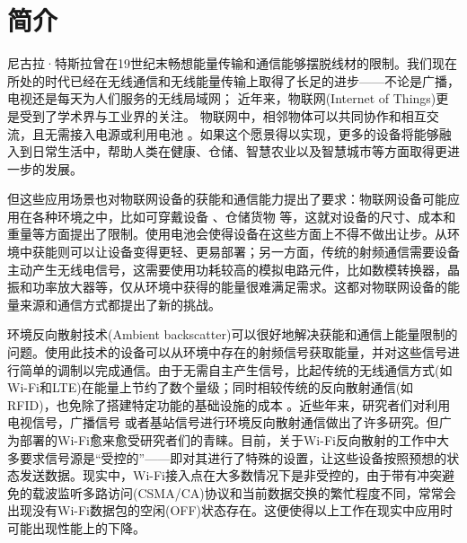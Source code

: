 
\chapter{简介}
\label{chap:introduction}

尼古拉·特斯拉曾在19世纪末畅想能量传输和通信能够摆脱线材的限制。我们现在所处的时代已经在无线通信和无线能量传输上取得了长足的进步——不论是广播，电视还是每天为人们服务的无线局域网；
近年来，物联网(Internet of Things)更是受到了学术界与工业界的关注。
物联网中，相邻物体可以共同协作和相互交流，且无需接入电源或利用电池\cite{gershenfeld2004internet}
。如果这个愿景得以实现，更多的设备将能够融入到日常生活中，帮助人类在健康、仓储、智慧农业以及智慧城市等方面取得更进一步的发展。

但这些应用场景也对物联网设备的获能和通信能力提出了要求：物联网设备可能应用在各种环境之中，比如可穿戴设备\cite{baker2017internet}
、仓储货物\cite{lee2018design}
等，这就对设备的尺寸、成本和重量等方面提出了限制。使用电池会使得设备在这些方面上不得不做出让步。从环境中获能则可以让设备变得更轻、更易部署；另一方面，传统的射频通信需要设备主动产生无线电信号，这需要使用功耗较高的模拟电路元件，比如数模转换器，晶振和功率放大器等，仅从环境中获得的能量很难满足需求。这都对物联网设备的能量来源和通信方式都提出了新的挑战。

环境反向散射技术(Ambient backscatter)可以很好地解决获能和通信上能量限制的问题。使用此技术的设备可以从环境中存在的射频信号获取能量，并对这些信号进行简单的调制以完成通信。由于无需自主产生信号，比起传统的无线通信方式(如Wi-Fi和LTE)在能量上节约了数个量级；同时相较传统的反向散射通信(如RFID)，也免除了搭建特定功能的基础设施的成本\cite{liu2013ambient}
。近些年来，研究者们对利用电视信号\cite{liu2013ambient}，广播信号\cite{wang2017fm}
或者基站信号\cite{parks2014sifting}进行环境反向散射通信做出了许多研究。但广为部署的Wi-Fi愈来愈受研究者们的青睐。目前，关于Wi-Fi反向散射的工作中大多要求信号源是“受控的”——即对其进行了特殊的设置，让这些设备按照预想的状态发送数据。现实中，Wi-Fi接入点在大多数情况下是非受控的，由于带有冲突避免的载波监听多路访问(CSMA/CA)协议和当前数据交换的繁忙程度不同，常常会出现没有Wi-Fi数据包的空闲(OFF)状态存在。这便使得以上工作在现实中应用时可能出现性能上的下降。

